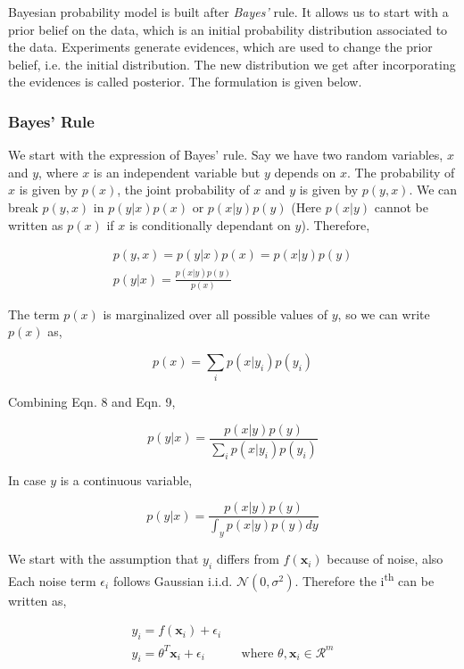 \documentclass[english]{tktltiki}
\begin{document}
Bayesian probability model is built after \textit{Bayes'} rule. It allows us to start with a prior belief on the data, which is an initial probability distribution associated to the data. Experiments generate evidences, which are used to change the prior belief, i.e. the initial distribution. The new distribution we get after incorporating the evidences is called posterior. The formulation is given below.

\subsubsection{Bayes' Rule}

We start with the expression of Bayes' rule. Say we have two random variables, $x$ and $y$, where $x$ is an independent variable but $y$ depends on $x$. The probability of $x$ is given by $p(x)$, the joint probability of $x$ and $y$ is given by $p(y, x)$. We can break $p(y, x)$ in $p(y|x)p(x)$ or $p(x|y)p(y)$ (Here $p(x|y)$ cannot be written as $p(x)$ if $x$ is conditionally dependant on $y$). Therefore,

\begin{eqnarray}
p(y, x) = p(y|x)p(x) = p(x|y)p(y)\nonumber\\
p(y|x) = \frac{p(x|y)p(y)}{p(x)}
\end{eqnarray}


The term $p(x)$ is marginalized over all possible values of $y$, so we can write $p(x)$ as,

\begin{equation}
p(x) = \sum_i{p(x|y_i)p(y_i)}
\end{equation}


Combining Eqn. 8 and Eqn. 9,

\begin{equation}
p(y|x) = \frac{p(x|y)p(y)}{\sum_i{p(x|y_i)p(y_i)}}
\end{equation}

In case $y$ is a continuous variable,

\begin{equation}
p(y|x) = \frac{p(x|y)p(y)}{\int_y{p(x|y)p(y)dy}}
\end{equation}

We start with the assumption that $y_i$ differs from $f(\mathbf{x}_i)$ because of noise, also Each noise term $\epsilon_i$ follows Gaussian i.i.d. $\mathcal{N}(0, \sigma ^2)$. Therefore the i\textsuperscript{th} can be written as,

\begin{eqnarray}
y_i = f(\mathbf{x}_i) + \epsilon_i \nonumber \\
y_i = \theta ^T \mathbf{x}_i + \epsilon_i && \text{where $\theta, \mathbf{x}_i \in \mathcal{R}^m$}
\end{eqnarray}
\end{document}
